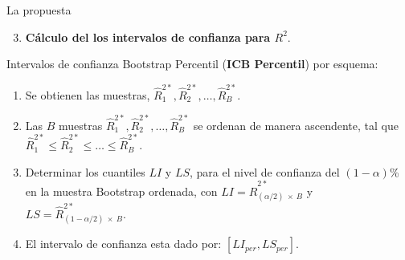 \documentclass[serif, aspectratio=169]{beamer}
\begin{document}
\begin{frame}{La propuesta}
	
	\begin{enumerate}
		\setcounter{enumi}{2}
		\item {\large \textbf{Cálculo del los intervalos de confianza para $R^2$}.}\\
		\vspace{.2cm}
	\end{enumerate}
	
	Intervalos de confianza Bootstrap Percentil (\textbf{ICB Percentil}) por esquema:
	
	\begin{enumerate}
		\item Se obtienen las muestras, $\hat{R}^{2*}_{1} , \hat{R}^{2*}_{2}, \dots,\hat{R}^{2*}_{B}$.
		
		\item Las $B$ muestras $\hat{R}^{2*}_{1}, \hat{R}^{2*}_{2},\dots, \hat{R}^{2*}_{B} $ se ordenan de manera ascendente, tal que $\hat{R}^{2*}_{1} \leq \hat{R}^{2*}_{2} \leq \dots \leq \hat{R}^{2*}_{B} $.
		
		\item Determinar los cuantiles $LI$ y $LS$, para el nivel de confianza del $(1-\alpha)$\% en la muestra Bootstrap ordenada, con $LI = \hat{R}^{2*}_{ ( \alpha/2 ) \: \times \: B} $ y $LS = \hat{R}^{2*}_{ (1 - \alpha/2) \: \times \: B} $.
		
		\item El intervalo de confianza esta dado por: $[LI_{per}, LS_{per}]$.
	\end{enumerate}
	 
\end{frame}
\end{document}
